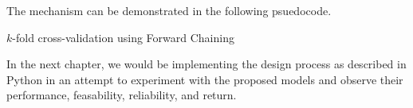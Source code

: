 The mechanism can be demonstrated in the following psuedocode. \\

\begin{algorithm}
\caption{$k$-fold cross-validation using Forward Chaining}\label{kfoldcross}
\begin{algorithmic}
\EndProcedure
\end{algorithmic}
\end{algorithm}

In the next chapter, we would be implementing the design process as described in Python in an attempt to experiment with the proposed models and observe their performance, feasability, reliability, and return. 







